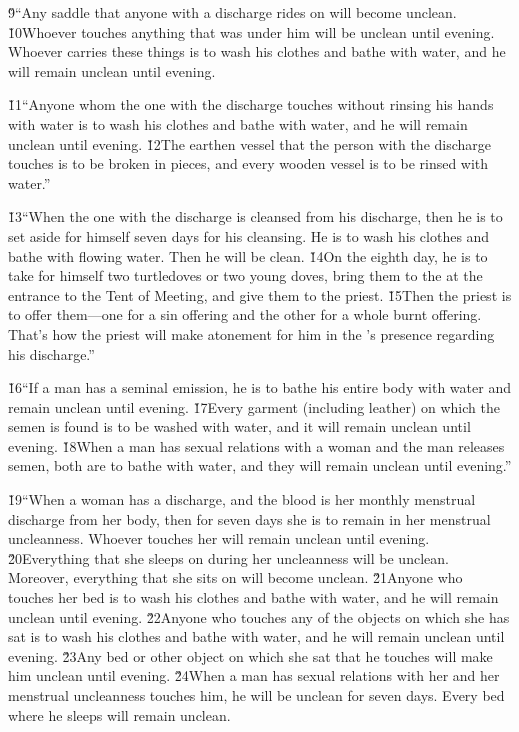 \v{9}``Any saddle that anyone with a discharge rides on will become unclean. \v{10}Whoever touches anything that was under him will be unclean until evening. Whoever carries these things is to wash his clothes and bathe with water, and he will remain unclean until evening.

\v{11}``Anyone whom the one with the discharge touches without rinsing his hands with water is to wash his clothes and bathe with water, and he will remain unclean until evening. \v{12}The earthen vessel that the person with the discharge touches is to be broken in pieces, and every wooden vessel is to be rinsed with water.''

\v{13}``When the one with the discharge is cleansed from his discharge, then he is to set aside for himself seven days for his cleansing. He is to wash his clothes and bathe with flowing water. Then he will be clean. \v{14}On the eighth day, he is to take for himself two turtledoves or two young doves, bring them to the  at the entrance to the Tent of Meeting, and give them to the priest. \v{15}Then the priest is to offer them---one for a sin offering and the other for a whole burnt offering. That's how the priest will make atonement for him in the 's presence regarding his discharge.''

\v{16}``If a man has a seminal emission, he is to bathe his entire body with water and remain unclean until evening. \v{17}Every garment (including leather) on which the semen is found is to be washed with water, and it will remain unclean until evening. \v{18}When a man has sexual relations with a woman and the man releases semen, both are to bathe with water, and they will remain unclean until evening.''

\v{19}``When a woman has a discharge, and the blood is her monthly menstrual discharge from her body, then for seven days she is to remain in her menstrual uncleanness. Whoever touches her will remain unclean until evening. \v{20}Everything that she sleeps on during her uncleanness will be unclean. Moreover, everything that she sits on will become unclean. \v{21}Anyone who touches her bed is to wash his clothes and bathe with water, and he will remain unclean until evening. \v{22}Anyone who touches any of the objects on which she has sat is to wash his clothes and bathe with water, and he will remain unclean until evening. \v{23}Any bed or other object on which she sat that he touches will make him unclean until evening. \v{24}When a man has sexual relations with her and her menstrual uncleanness touches him, he will be unclean for seven days. Every bed where he sleeps will remain unclean.

